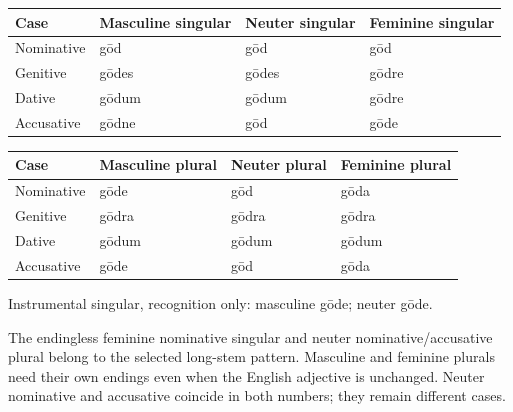 \par\begingroup
\fontsize{10.5}{13.2}\selectfont
\setlength{\LTleft}{0pt}\setlength{\LTright}{\fill}
\noindent
\begin{tabular}{@{}>{\raggedright\arraybackslash}p{22.0mm}>{\raggedright\arraybackslash}p{31.188mm}>{\raggedright\arraybackslash}p{31.188mm}>{\raggedright\arraybackslash}p{31.188mm}@{}}
\toprule
\textbf{Case} & \textbf{Masculine singular} & \textbf{Neuter singular} & \textbf{Feminine singular} \\
\midrule
Nominative & gōd & gōd & gōd \\
Genitive & gōdes & gōdes & gōdre \\
Dative & gōdum & gōdum & gōdre \\
Accusative & gōdne & gōd & gōde \\
\bottomrule
\end{tabular}
\par\endgroup
\par\addvspace{5pt}
\par\begingroup
\fontsize{10.5}{13.2}\selectfont
\setlength{\LTleft}{0pt}\setlength{\LTright}{\fill}
\noindent
\begin{tabular}{@{}>{\raggedright\arraybackslash}p{22.0mm}>{\raggedright\arraybackslash}p{31.188mm}>{\raggedright\arraybackslash}p{31.188mm}>{\raggedright\arraybackslash}p{31.188mm}@{}}
\toprule
\textbf{Case} & \textbf{Masculine plural} & \textbf{Neuter plural} & \textbf{Feminine plural} \\
\midrule
Nominative & gōde & gōd & gōda \\
Genitive & gōdra & gōdra & gōdra \\
Dative & gōdum & gōdum & gōdum \\
Accusative & gōde & gōd & gōda \\
\bottomrule
\end{tabular}
\par\endgroup
Instrumental singular, recognition only: masculine gōde; neuter gōde.

The endingless feminine nominative singular and neuter nominative/\allowbreak{}accusative plural belong to the selected long-stem pattern. Masculine and feminine plurals need their own endings even when the English adjective is unchanged. Neuter nominative and accusative coincide in both numbers; they remain different cases.

